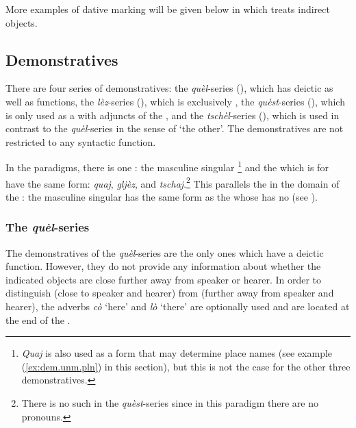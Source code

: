 More examples of dative marking will be given below in  which treats indirect objects.

\subsection{Demonstratives}\label{sec:3.2.2.}
There are four series of demonstratives: the \textit{quèl}-series (), which has deictic as well as  functions, the \textit{lèz}-series ({}), which is exclusively , the \textit{quèst}-series ({}), which is only used as a  with  adjuncts of the , and the \textit{tschèl}-series  ({}), which is used in contrast to the \textit{quèl}-series in the sense of `the other'. The demonstratives are not restricted to any syntactic function.

In the  paradigms, there is one : the masculine singular \footnote{\textit{Quaj} is also used as a form that may determine place names (see example (\ref{ex:dem.unm.pln}) in this section), but this is not the case for the other three demonstratives.} and the  which is  for  have the same form: \textit{quaj}, \textit{gljèz}, and \textit{tschaj}.\footnote{There is no such  in the \textit{quèst}-series since in this paradigm there are no pronouns.} This parallels the  in the domain of the : the masculine singular  has the same form as the   whose  has no  (see ).

\subsubsection{The \textit{quèl}-series}\label{sec:3.2.2.1}

The demonstratives of the \textit{quèl}-series are the only ones which have a deictic function. However, they do not provide any information about whether the indicated objects are close further away from speaker or hearer. In order to distinguish  (close to speaker and hearer) from  (further away from speaker and hearer), the adverbs \textit{cò} `here' and \textit{lò} `there' are optionally used and are located at the end of the .


